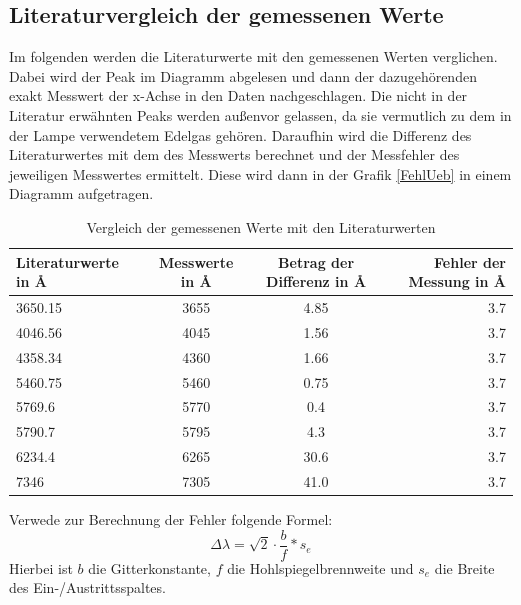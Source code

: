 \subsection{Literaturvergleich der gemessenen Werte} \label{Messlit}

Im folgenden werden die Literaturwerte \cite[S. 1474]{CRCHandbook2003} mit den gemessenen Werten verglichen. Dabei wird der Peak im Diagramm abgelesen und dann der dazugehörenden 
exakt Messwert der x-Achse in den Daten nachgeschlagen. Die nicht in der Literatur erwähnten Peaks werden außenvor gelassen, da sie vermutlich zu dem in der Lampe verwendetem Edelgas 
gehören. Daraufhin wird die Differenz des Literaturwertes mit dem des Messwerts berechnet und der Messfehler des jeweiligen Messwertes ermittelt. Diese wird dann in der Grafik \ref{FehlUeb} 
in einem Diagramm aufgetragen.
\begin{table}[h]
    \centering
    \begin{tabular}[h]{l|c|c|r}


        Literaturwerte in \r{A} & Messwerte in \r{A} & Betrag der Differenz in \r{A} & Fehler der Messung in \r{A}\\
       \hline
       3650.15  & 3655 & 4.85 & 3.7\\
       4046.56  & 4045 & 1.56 & 3.7\\
       4358.34 & 4360 & 1.66  & 3.7\\
       5460.75 & 5460 & 0.75 & 3.7\\
       5769.6  & 5770 & 0.4 & 3.7\\
       5790.7  & 5795 & 4.3 & 3.7\\
       6234.4  & 6265 & 30.6 & 3.7\\
       7346  & 7305 & 41.0 & 3.7\\
\end{tabular}
    \caption{Vergleich der gemessenen Werte mit den Literaturwerten}
\end{table}
Verwede zur Berechnung der Fehler folgende Formel:
\begin{equation}
    \Delta \lambda = \sqrt{2} \cdot\frac{b}{f}*s_e 
\end{equation}
Hierbei ist $b$ die Gitterkonstante, $f$ die Hohlspiegelbrennweite und $s_e$ die Breite des Ein-/Austrittsspaltes.\\
